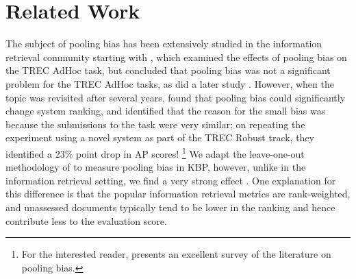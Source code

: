 \section{Related Work}
\label{sec:related}

The subject of pooling bias has been extensively studied in the information retrieval community starting with \citet{zobel1998reliable}, which examined the effects of pooling bias on the TREC AdHoc task, but concluded that pooling bias was not a significant problem for the TREC AdHoc tasks, as did a later study \citep{voorhees1999overview}.
However, when the topic was revisited after several years, \citet{buckley2004incomplete} found that pooling bias could significantly change system ranking, and \citet{buckley2007bias} identified that the reason for the small bias was because the submissions to the task were very similar; on repeating the experiment using a novel system as part of the TREC Robust track, they identified a 23\% point drop in AP scores!%
\footnote{For the interested reader, \citet{weber2010measurement} presents an excellent survey of the literature on pooling bias.}
We adapt the leave-one-out methodology of \citet{zobel1998reliable} to measure pooling bias in KBP, however, unlike in the information retrieval setting, we find a very strong effect .
One explanation for this difference is that the popular information retrieval metrics are rank-weighted, and unassessed documents typically tend to be lower in the ranking and hence contribute less to the evaluation score.

